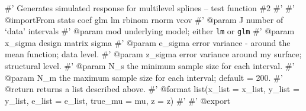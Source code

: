 \documentclass[
]{article}
\begin{document}
\#' Generates simulated response for multilevel splines -- test function
\#2 \#' \#' @importFrom stats coef glm lm rbinom rnorm vcov \#' @param J
number of `data' intervals \#' @param mod underlying model; either
\texttt{lm} or \texttt{glm} \#' @param x\_sigma design matrix sigma \#'
@param e\_sigma error variance - around the mean function; data level.
\#' @param z\_sigma error variance around my surface; structural level.
\#' @param N\_s the minimum sample size for each interval. \#' @param
N\_m the maximum sample size for each interval; default = 200. \#'
@return returns a list described above. \#' @format list(x\_list =
x\_list, y\_list = y\_list, e\_list = e\_list, true\_mu = mu, z = z) \#'
 \#' @export
\end{document}
